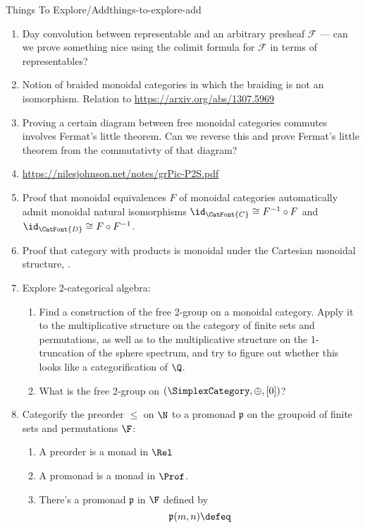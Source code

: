 \begin{remark}{Things To Explore/Add}{things-to-explore-add}
\begin{enumerate}
\begin{enumerate}
            \end{enumerate}
        \item Day convolution between representable and an arbitrary presheaf $\mathcal{F}$ --- can we prove something nice using the colimit formula for $\mathcal{F}$ in terms of representables?
        \item Notion of braided monoidal categories in which the braiding is not an isomorphism. Relation to \url{https://arxiv.org/abs/1307.5969}
        \item Proving a certain diagram between free monoidal categories commutes involves Fermat's little theorem. Can we reverse this and prove Fermat's little theorem from the commutativty of that diagram?
        \item \url{https://nilesjohnson.net/notes/grPic-P2S.pdf}
        \item Proof that monoidal equivalences $F$ of monoidal categories automatically admit monoidal natural isomorphisms $\id_{\CatFont{C}}\cong F^{-1}\circ F$ and $\id_{\CatFont{D}}\cong F\circ F^{-1}$.
        \item Proof that category with products is monoidal under the Cartesian monoidal structure, \cite{MO382264}.
        \item Explore 2-categorical algebra:
            \begin{enumerate}
                \item Find a construction of the free 2-group on a monoidal category. Apply it to the multiplicative structure on the category of finite sets and permutations, as well as to the multiplicative structure on the 1-truncation of the sphere spectrum, and try to figure out whether this looks like a categorification of $\Q$.
                \item What is the free 2-group on $(\SimplexCategory,\oplus,[0])$?
            \end{enumerate}
        \item Categorify the preorder $\leq$ on $\N$ to a promonad $\mathfrak{p}$ on the groupoid of finite sets and permutations $\F$:
            \begin{enumerate}
                \item A preorder is a monad in $\Rel$
                \item A promonad is a monad in $\Prof$.
                \item There's a promonad $\mathfrak{p}$ in $\F$ defined by
                    \[
                        \mathfrak{p}(m,n)%
                        \defeq%
\]
\end{enumerate}
\end{enumerate}
\end{remark}
